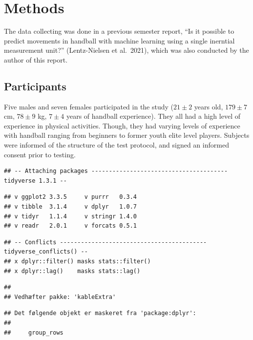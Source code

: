 \documentclass[
]{article}
\author{}
\date{\vspace{-2.5em}}
\begin{document}
\hypertarget{methods}{%
\section{Methods}\label{methods}}

The data collecting was done in a previous semester report, ``Is it
possible to predict movements in handball with machine learning using a
single inerntial measurement unit?'' (Lentz-Nielsen et al.~2021), which
was also conducted by the author of this report.

\vspace{0.5cm}

\hypertarget{participants}{%
\subsection{Participants}\label{participants}}

Five males and seven females participated in the study (\(21 \pm 2\)
years old, \(179 \pm 7\) cm, \(78 \pm 9\) kg, \(7 \pm 4\) years of
handball experience). They all had a high level of experience in
physical activities. Though, they had varying levels of experience with
handball ranging from beginners to former youth elite level players.
Subjects were informed of the structure of the test protocol, and signed
an informed consent prior to testing.

\begin{verbatim}
## -- Attaching packages --------------------------------------- tidyverse 1.3.1 --
\end{verbatim}

\begin{verbatim}
## v ggplot2 3.3.5     v purrr   0.3.4
## v tibble  3.1.4     v dplyr   1.0.7
## v tidyr   1.1.4     v stringr 1.4.0
## v readr   2.0.1     v forcats 0.5.1
\end{verbatim}

\begin{verbatim}
## -- Conflicts ------------------------------------------ tidyverse_conflicts() --
## x dplyr::filter() masks stats::filter()
## x dplyr::lag()    masks stats::lag()
\end{verbatim}

\begin{verbatim}
## 
## Vedhæfter pakke: 'kableExtra'
\end{verbatim}

\begin{verbatim}
## Det følgende objekt er maskeret fra 'package:dplyr':
## 
##     group_rows
\end{verbatim}
\end{document}
